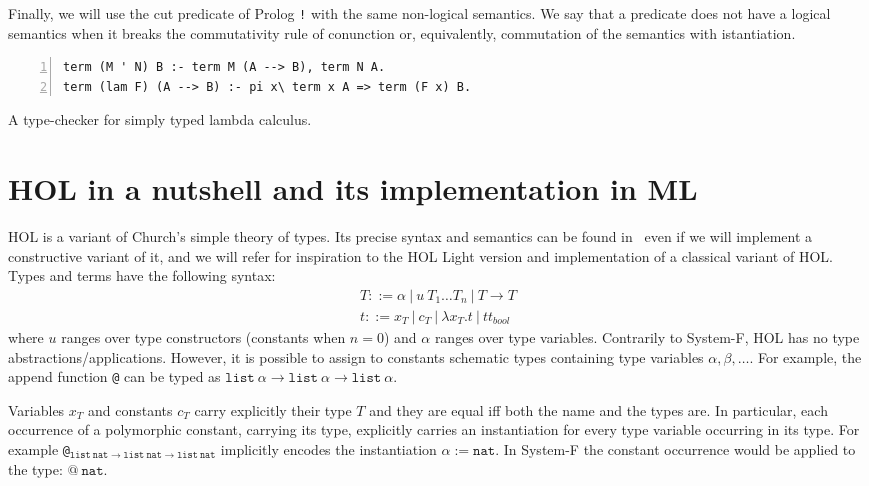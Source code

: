 \documentclass[preprint]{sigplanconf}
\begin{document}
Finally, we will use the cut predicate of Prolog \texttt{!} with the same
non-logical semantics. We say that a predicate does not have a logical semantics
when it breaks the commutativity rule of conunction or, equivalently, commutation of the semantics with istantiation.

\begin{table}[t]
\begin{small}
\begin{Verbatim}[numbers=left,numbersep=1pt,frame=leftline]
term (M ' N) B :- term M (A --> B), term N A.
term (lam F) (A --> B) :- pi x\ term x A => term (F x) B.
\end{Verbatim}
\end{small}
\caption{\label{type-checker1}A type-checker for simply typed lambda calculus.}
\end{table}

\section{HOL in a nutshell and its implementation in ML}
HOL is a variant of Church's simple theory of types. Its precise syntax and semantics can be found in~\cite{the_HOL_system_LOGIC} even if we will implement a constructive variant of it, and we will refer for inspiration to the HOL Light version and implementation of a classical variant of HOL. Types and terms have the
following syntax:
$$\begin{array}{l}
T ::= \alpha ~|~ u~T_1\ldots T_n ~|~ T \rightarrow T\\
t ::= x_T ~|~ c_T ~|~ \lambda x_T. t ~|~ {tt_{bool}}
\end{array}$$
where $u$ ranges over type constructors (constants when $n=0$) and $\alpha$
ranges over type variables. Contrarily to System-F,%
HOL has no type
abstractions/applications. However, it is possible to assign to constants
schematic types containing type variables $\alpha, \beta, \ldots$. For example,
the append function \texttt{@} can be typed as $\mathtt{list}~\alpha \rightarrow \mathtt{list}~\alpha \rightarrow \mathtt{list}~\alpha$.

Variables $x_T$ and constants $c_T$ carry explicitly their type $T$ and they are equal iff both the name and the types are. In particular, each occurrence of a polymorphic constant, carrying its type, explicitly carries an instantiation for every type variable occurring in its type. For example
\texttt{@}$_{\mathtt{list}~\mathtt{nat} \rightarrow \mathtt{list}~\mathtt{nat} \rightarrow \mathtt{list}~\mathtt{nat}}$ implicitly encodes the instantiation $\alpha := \mathtt{nat}$. In System-F the constant occurrence would be applied to the type: $\texttt{@}~\mathtt{nat}$.
\end{document}
